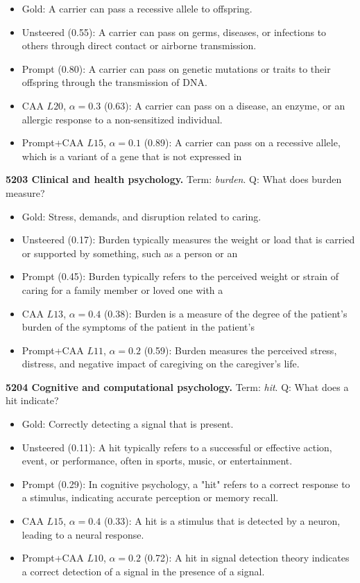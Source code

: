 \begin{itemize}\setlength{\itemsep}{0.15em}\setlength{\parsep}{0pt}\setlength{\topsep}{0.2em}
\item Gold: A carrier can pass a recessive allele to offspring.
\item Unsteered (0.55): A carrier can pass on germs, diseases, or infections to others through direct contact or airborne transmission.
\item Prompt (0.80): A carrier can pass on genetic mutations or traits to their offspring through the transmission of DNA.
\item CAA $L20$, $\alpha=0.3$ (0.63): A carrier can pass on a disease, an enzyme, or an allergic response to a non-sensitized individual.
\item Prompt+CAA $L15$, $\alpha=0.1$ (0.89): A carrier can pass on a recessive allele, which is a variant of a gene that is not expressed in
\end{itemize}
\medskip\noindent\textbf{5203 Clinical and health psychology.} Term: \emph{burden}.
Q: What does burden measure?
\begin{itemize}\setlength{\itemsep}{0.15em}\setlength{\parsep}{0pt}\setlength{\topsep}{0.2em}
\item Gold: Stress, demands, and disruption related to caring.
\item Unsteered (0.17): Burden typically measures the weight or load that is carried or supported by something, such as a person or an
\item Prompt (0.45): Burden typically refers to the perceived weight or strain of caring for a family member or loved one with a
\item CAA $L13$, $\alpha=0.4$ (0.38): Burden is a measure of the degree of the patient's burden of the symptoms of the patient in the patient's
\item Prompt+CAA $L11$, $\alpha=0.2$ (0.59): Burden measures the perceived stress, distress, and negative impact of caregiving on the caregiver's life.
\end{itemize}
\medskip\noindent\textbf{5204 Cognitive and computational psychology.} Term: \emph{hit}.
Q: What does a hit indicate?
\begin{itemize}\setlength{\itemsep}{0.15em}\setlength{\parsep}{0pt}\setlength{\topsep}{0.2em}
\item Gold: Correctly detecting a signal that is present.
\item Unsteered (0.11): A hit typically refers to a successful or effective action, event, or performance, often in sports, music, or entertainment.
\item Prompt (0.29): In cognitive psychology, a "hit" refers to a correct response to a stimulus, indicating accurate perception or memory recall.
\item CAA $L15$, $\alpha=0.4$ (0.33): A hit is a stimulus that is detected by a neuron, leading to a neural response.
\item Prompt+CAA $L10$, $\alpha=0.2$ (0.72): A hit in signal detection theory indicates a correct detection of a signal in the presence of a signal.
\end{itemize}
